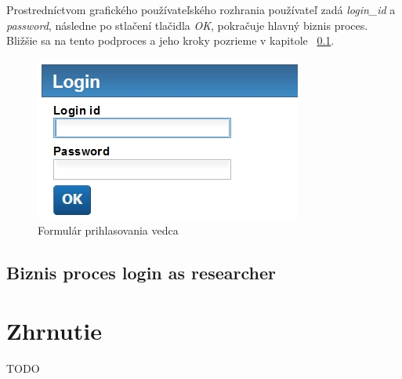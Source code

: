 \documentclass[10pt,oneside,slovak,a4paper]{article}
\begin{document}
Prostredníctvom grafického používateľského rozhrania používateľ zadá \textit{login\_id} a \textit{password}, následne po stlačení tlačidla \textit{OK}, pokračuje hlavný biznis proces. Bližšie sa na tento podproces a jeho kroky pozrieme v kapitole ~\ref{researcher}.

\begin{figure} [H]
\centering
\includegraphics[scale=0.7]{forms/formLogin.jpg} 
\caption{Formulár prihlasovania vedca}
\end{figure}


\subsection{Biznis proces login as researcher} \label{researcher}

\newpage

\section{Zhrnutie}
TODO
\end{document}

